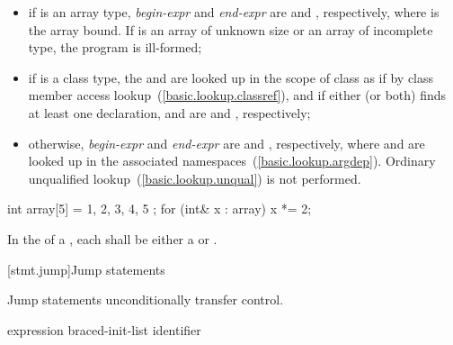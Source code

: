 \begin{itemize}
\item if  is an array type, \textit{begin-expr} and \textit{end-expr} are
 and , respectively, where  is
the array bound. If  is an array of unknown size or an array of
incomplete type, the program is ill-formed;

\item if  is a class type, the 
 and  are looked up in the scope of class 
as if by class member access lookup~(\ref{basic.lookup.classref}), and if either
(or both) finds at least one declaration,  and
 are  and ,
respectively;

\item otherwise, \textit{begin-expr} and \textit{end-expr} are 
and , respectively, where  and  are looked
up in the associated namespaces~(\ref{basic.lookup.argdep}).
\enternote Ordinary unqualified lookup~(\ref{basic.lookup.unqual}) is not
performed. \exitnote
\end{itemize}

\enterexample
\begin{codeblock}
int array[5] = { 1, 2, 3, 4, 5 };
for (int& x : array)
  x *= 2;
\end{codeblock}
\exitexample%

\pnum
In the  of a ,
each  shall be either a 
or .

[stmt.jump]{Jump statements}%

\pnum
Jump statements unconditionally transfer control.
%

%
%
%
%
%
%
\begin{bnf}
\br
    \br
    \br
     expression\opt \terminal{;}\br
     braced-init-list \terminal{;}\br
     identifier \terminal{;}
\end{bnf}


